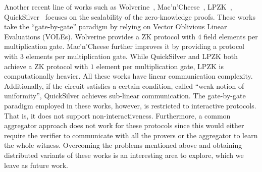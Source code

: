 Another recent line of works such as Wolverine~\cite{wolverine}, Mac'n'Cheese~\cite{macncheese}, LPZK~\cite{LPZK}, QuickSilver~\cite{quicksilver} focuses on the scalability of the zero-knowledge proofs. These works take the ``gate-by-gate'' paradigm by relying on Vector Oblivious Linear Evaluations (VOLEs). Wolverine provides a ZK protocol with $4$ field elements per multiplication gate. Mac'n'Cheese further improves it by providing a protocol with $3$ elements per multiplication gate. While QuickSilver and LPZK both achieve a ZK protocol with $1$ element per multiplication gate, LPZK is computationally heavier. All these works have linear communication complexity. Additionally, if the circuit satisfies a certain condition, called ``weak notion of uniformity'', QuickSilver achieves sub-linear communication. The gate-by-gate paradigm employed in these works, however, is restricted to interactive protocols. That is, it does not support non-interactiveness.
Furthermore, a common aggregator approach does not work for these protocols since this would either require the verifier to communicate with all the provers or the aggregator to learn the whole witness. Overcoming the problems mentioned above and obtaining distributed variants of these works is an interesting area to explore, which we leave as future work.



